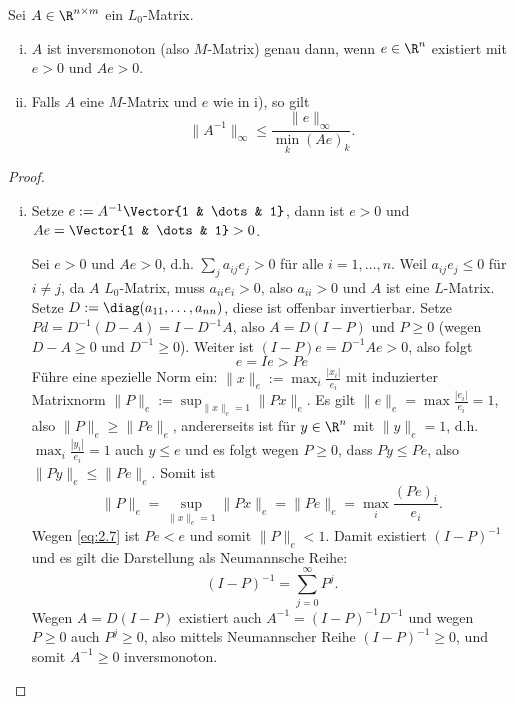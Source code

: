 \begin{st}[$M$-Kriterium] \label{2.28}
	Sei $A \in \R^{n\times m}$ ein $L_0$-Matrix.
	\begin{enumerate}[i)]
		\item
			$A$ ist inversmonoton (also $M$-Matrix) genau dann, wenn $e \in \R^n$ existiert mit $e > 0$ und $Ae > 0$.
		\item
			Falls $A$ eine $M$-Matrix und $e$ wie in i), so gilt
			\[
				\|A^{-1}\|_{\infty} \le \frac{\|e\|_\infty}{\min_{k}(Ae)_k}.
			\]
	\end{enumerate}
	\begin{proof}
		\begin{enumerate}[i)]
			\item
				\begin{segnb}{\ProofImplication}
					Setze $e := A^{-1} \Vector{1 & \dots & 1}$, dann ist $e > 0$ und $Ae = \Vector{1 & \dots & 1} > 0$.
				\end{segnb}
				\begin{seg}{\ProofImplication*}
					Sei $e > 0$ und $Ae > 0$, d.h. $\sum_{j} a_{ij} e_j > 0$ für alle $i = 1, \dotsc, n$.
					Weil $a_{ij} e_j \le 0$ für $i \neq j$, da $A$ $L_0$-Matrix, muss $a_{ii} e_i > 0$, also $a_{ii} > 0$ und $A$ ist eine $L$-Matrix.
					Setze $D := \diag(a_{11}, \dotsc, a_{nn})$, diese ist offenbar invertierbar.
					Setze $P d= D^{-1}(D-A) = I - D^{-1} A$, also $A = D(I-P)$ und $P \ge 0$ (wegen $D - A \ge 0$ und $D^{-1} \ge 0$).
					Weiter ist $(I-P)e = D^{-1}A e > 0$, also folgt
					\begin{equation} \label{eq:2.7}
						e = Ie > Pe
					\end{equation}
					Führe eine spezielle Norm ein: $\|x\|_e := \max_i \frac{|x_i|}{e_i}$ mit induzierter Matrixnorm $\|P\|_e := \sup_{\|x\|_e = 1} \|Px\|_e$.
					Es gilt $\|e\|_e = \max \frac{|e_i|}{e_i} = 1$, also $\|P\|_e \ge \|Pe\|_e$, andererseits ist für $y \in \R^n$ mit $\|y\|_e = 1$, d.h. $\max_i \frac{|y_i|}{e_i} = 1$ auch $y \le e$ und es folgt wegen $P \ge 0$, dass $Py \le Pe$, also $\|Py\|_e \le \|Pe\|_e$.
					Somit ist
					\[
						\|P\|_e = \sup_{\|x\|_e = 1} \|Px\|_e = \|Pe\|_e = \max_i \frac{(Pe)_i}{e_i}.
					\]
					Wegen \eqref{eq:2.7} ist $Pe < e$ und somit $\|P\|_e < 1$.
					Damit existiert $(I - P)^{-1}$ und es gilt die Darstellung als Neumannsche Reihe:
					\[
						(I - P)^{-1} = \sum_{j=0}^\infty P^j.
					\]
					Wegen $A = D(I-P)$ existiert auch $A^{-1} = (I-P)^{-1}D^{-1}$ und wegen $P \ge 0$ auch $P^j \ge 0$, also mittels Neumannscher Reihe $(I-P)^{-1} \ge 0$, und somit $A^{-1} \ge 0$ inversmonoton.

\end{seg}
\end{enumerate}
\end{proof}
\end{st}
